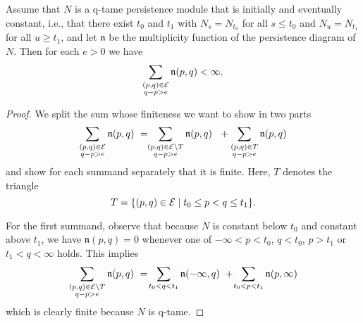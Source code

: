 \begin{thm}
    Assume that $N$ is a q-tame persistence module that is initially and eventually constant, i.e., that there exist $t_0$ and $t_1$ with $N_s = N_{t_0}$ for all $s \leq t_0$ and $N_u = N_{t_1}$ for all $u \geq t_1$, and let $\mathfrak{n}$ be the multiplicity function of the persistence diagram of $N$. Then for each $e>0$ we have 
    \[
    \sum_{ \substack{ (p,q) \in \mathcal{E} \\ q-p > e } } \mathfrak{n} (p,q) < \infty.
    \]
\end{thm}

\begin{proof}
    We split the sum whose finiteness we want to show in two parts
    \[
    \sum_{ \substack{ (p,q) \in \mathcal{E} \\ q-p > e } } \mathfrak{n} (p,q)
    \ = \!\!
    \sum_{ \substack{ (p,q) \in \mathcal{E} \setminus T \\ q-p > e } } \mathfrak{n} (p,q)
    \ \ +
    \sum_{ \substack{ (p,q) \in T \\ q-p > e } } \mathfrak{n} (p,q)
    \]
    and show for each summand separately that it is finite. 
    Here, $T$ denotes the triangle
    \[
    T = \{(p,q) \in \mathcal{E} \mid t_0 \leq p < q \leq t_1\}.
    \]
    
    For the first summand, observe that because $N$ is constant below $t_0$ and constant above $t_1$, we have $\mathfrak{n}(p,q) = 0$ whenever one of $-\infty < p < t_0$, $q < t_0$, $p > t_1$ or $t_1 < q < \infty$ holds.
    This implies 
    \[
    \sum_{ \substack{ (p,q) \in \mathcal{E} \setminus T \\ q-p > e } } \mathfrak{n} (p,q)
    \ = \!
    \sum_{t_0 < q < t_1} \mathfrak{n} (-\infty,q)
    \ + \!
    \sum_{t_0 < p < t_1} \mathfrak{n} (p, \infty)
    \]
    which is clearly finite because $N$ is q-tame.
    

\end{proof}

